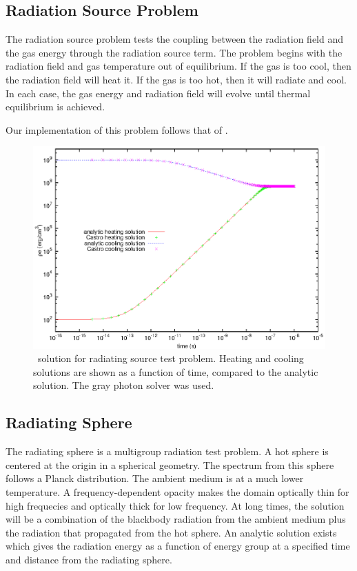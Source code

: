 \subsection{Radiation Source Problem}

The radiation source problem tests the coupling between the radiation
field and the gas energy through the radiation source term.  The
problem begins with the radiation field and gas temperature out of
equilibrium.  If the gas is too cool, then the radiation field will
heat it.  If the gas is too hot, then it will radiate and cool.  In
each case, the gas energy and radiation field will evolve until
thermal equilibrium is achieved.

Our implementation of this problem follows that of
\cite{swestymyra:2009}.

\begin{figure}[h]
\centering
\includegraphics[width=5.0in]{CastroVerification/radiating_source}
\caption{\label{fig:radsource} \castro\ solution for radiating source
  test problem.  Heating and cooling solutions are shown as a function
  of time, compared to the analytic solution.  The gray photon solver
  was used.}
\end{figure}


\subsection{Radiating Sphere}

The radiating sphere is a multigroup radiation test problem.  A hot
sphere is centered at the origin in a spherical geometry.  The
spectrum from this sphere follows a Planck distribution.  The ambient
medium is at a much lower temperature.  A frequency-dependent opacity
makes the domain optically thin for high frequecies and optically
thick for low frequency.  At long times, the solution will be a
combination of the blackbody radiation from the ambient medium plus
the radiation that propagated from the hot sphere.  An analytic
solution exists \cite{graziani:2008} which gives the radiation energy
as a function of energy group at a specified time and distance from
the radiating sphere.

